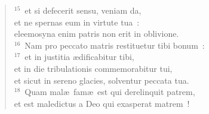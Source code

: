 \begin{flushleft}
\begin{verse}
${}^{15}$~et si defecerit sensu, veniam da,\\ et ne spernas eum in virtute tua~:\\ eleemosyna enim patris non erit in oblivione.\\
${}^{16}$~Nam pro peccato matris restituetur tibi bonum~:\\
${}^{17}$~et in justitia \ae dificabitur tibi,\\ et in die tribulationis commemorabitur tui,\\ et sicut in sereno glacies, solventur peccata tua.\\
${}^{18}$~Quam mal\ae\ fam\ae\ est qui derelinquit patrem,\\ et est maledictus a Deo qui exasperat matrem~!\end{verse}\end{flushleft}


